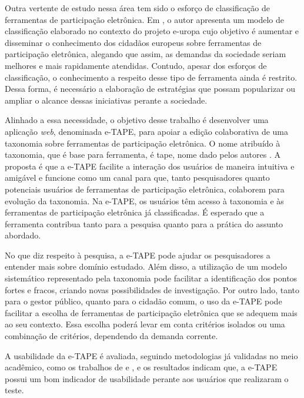 \par
Outra vertente de estudo nessa área tem sido o esforço de classificação de ferramentas de participação eletrônica. Em  , o autor apresenta um modelo 
de classificação elaborado no contexto do projeto \acrfull{e-uropa} cujo objetivo é aumentar e disseminar o conhecimento dos cidadãos europeus sobre ferramentas de participação 
eletrônica, alegando que assim, as demandas da sociedade seriam melhores e mais rapidamente atendidas. Contudo, apesar dos esforços de classificação, o conhecimento a respeito desse 
tipo de ferramenta ainda é restrito. Dessa forma, é necessário a elaboração de estratégias que possam popularizar ou ampliar o alcance dessas iniciativas perante a sociedade.

\par
Alinhado a essa necessidade, o objetivo desse trabalho é desenvolver uma aplicação \textit{web}, denominada e-TAPE, para apoiar a edição colaborativa de uma taxonomia sobre 
ferramentas de participação eletrônica. O nome atribuído à taxonomia, que é base para ferramenta, é \acrfull{tape}, nome dado pelos autores . 
A proposta é que a e-TAPE facilite a interação dos usuários de maneira intuitiva e amigável e funcione como um canal para que, tanto pesquisadores quanto potenciais usuários de
ferramentas de participação eletrônica, colaborem para evolução da taxonomia. Na e-TAPE, os usuários têm acesso à taxonomia e às ferramentas de participação eletrônica já classificadas.
É esperado que a ferramenta contribua tanto para a pesquisa quanto para a prática do assunto abordado. 

\par
No que diz respeito à pesquisa, a e-TAPE pode ajudar os pesquisadores a entender mais sobre domínio estudado. Além disso, a utilização de um modelo sistemático representado pela taxonomia 
pode facilitar a identificação dos pontos fortes e fracos, criando novas possibilidades de investigação. Por outro lado, tanto para o gestor público, quanto para o cidadão comum, 
o uso da e-TAPE pode facilitar a escolha de ferramentas de participação eletrônica que se adequem mais ao seu contexto. Essa escolha poderá levar em conta critérios 
isolados ou uma combinação de critérios, dependendo da demanda corrente. 

\par
A usabilidade da e-TAPE é avaliada, seguindo metodologias já validadas no meio acadêmico, como os trabalhos de  e , 
e os resultados indicam que, a e-TAPE possui um bom indicador de usabilidade perante aos 
usuários que realizaram o teste. 

